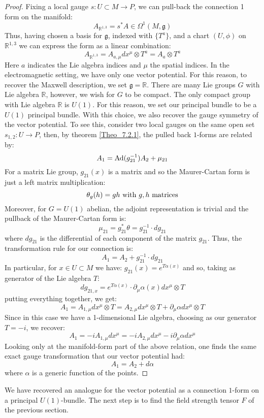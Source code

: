 \documentclass[12pt,a4paper]{report}
\theoremstyle{definition}
\theoremstyle{Theorem}
\theoremstyle{definition}
\theoremstyle{definition}
\begin{document}
	\begin{proof}
		Fixing a local gauge $s:U\subset M\rightarrow P$, we can pull-back the connection 1 form on the manifold:
		$$A_{\mathbb{R}^{1,3}}=s^*A\in\Omega^1(M,\mathfrak{g})$$
		Thus, having chosen a basis for $\mathfrak{g}$, indexed with $\{T^a\}$, and a chart $(U,\phi)$ on $\mathbb{R}^{1,3}$ we can express the form as a linear combination:
		$$A_{\mathbb{R}^{1,3}}=A_{a,\mu} dx^\mu\otimes T^a=A_a\otimes T^a$$
		Here $a$ indicates the Lie algebra indices and $\mu$ the spatial indices. In the electromagnetic setting, we have only one vector potential. For this reason, to recover the Maxwell description, we set $\mathfrak{g}=\mathbb{R}$. There are many Lie groups $G$ with Lie algebra $\mathbb{R}$, however, we wish for $G$ to be compact. The only compact group with Lie algebra $\mathbb{R}$ is $U(1)$. For this reason, we set our principal bundle to be a $U(1)$ principal bundle. With this choice, we also recover the gauge symmetry of the vector potential. To see this, consider two local gauges on the same open set $s_{1,2}:U\rightarrow P$, then, by theorem \ref{Theo_7.2.1}, the pulled back $1$-forms are related by:
		$$A_1=\hbox{Ad}(g_{21}^{-1})A_2+\mu_{21}$$
		For a matrix Lie group, $g_{21}(x)$ is a matrix and so the Maurer-Cartan form is just a left matrix multiplication: $$\theta_g(h)=gh\hbox{ with $g,h$ matrices}$$ 
		Moreover, for $G=U(1)$ abelian, the adjoint representation is trivial and the pullback of the Maurer-Cartan form is:
		$$\mu_{21}=g_{21}^*\theta=g_{21}^{-1}\cdot dg_{21}$$ 
		where $dg_{21}$ is the differential of each component of the matrix $g_{21}$. Thus, the transformation rule for our connection is:
		$$A_1=A_2+g_{21}^{-1}\cdot dg_{21}$$
		In particular, for $x\in U\subset M$ we have: $g_{21}(x)=e^{T\alpha(x)}$ and so, taking as generator of the Lie algebra $T$:
		$$dg_{21,x}=e^{T\alpha(x)}\cdot \partial_\mu\alpha(x)dx^\mu\otimes T$$
		putting everything together, we get:
		$$A_1=A_{1,\mu}dx^\mu\otimes T=A_{2,\mu}dx^\mu\otimes T+\partial_\mu\alpha dx^\mu\otimes T$$
		Since in this case we have a 1-dimensional Lie algebra, choosing as our generator $T=-i$, we recover:
		$$A_1=-iA_{1,\mu}dx^\mu=-iA_{2,\mu}dx^\mu-i\partial_\mu\alpha dx^\mu$$
		Looking only at the manifold-form part of the above relation, one finds the same exact gauge transformation that our vector potential had:
		$$A_1=A_2+d\alpha$$
		where $\alpha$ is a generic function of the points.
	\end{proof}
	We have recovered an analogue for the vector potential as a connection $1$-form on a principal $U(1)$-bundle. The next step is to find the field strength tensor $F$ of the previous section.
\end{document}
